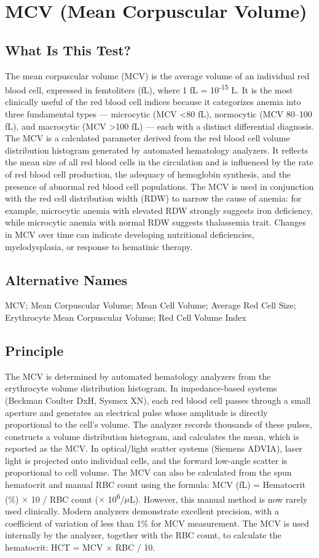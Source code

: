 \chapter{MCV (Mean Corpuscular Volume)}

\section*{What Is This Test?}
The mean corpuscular volume (MCV) is the average volume of an individual red blood cell, expressed in femtoliters (fL), where 1 fL = 10\textsuperscript{-15} L. It is the most clinically useful of the red blood cell indices because it categorizes anemia into three fundamental types --- microcytic (MCV <80 fL), normocytic (MCV 80--100 fL), and macrocytic (MCV >100 fL) --- each with a distinct differential diagnosis. The MCV is a calculated parameter derived from the red blood cell volume distribution histogram generated by automated hematology analyzers. It reflects the mean size of all red blood cells in the circulation and is influenced by the rate of red blood cell production, the adequacy of hemoglobin synthesis, and the presence of abnormal red blood cell populations. The MCV is used in conjunction with the red cell distribution width (RDW) to narrow the cause of anemia: for example, microcytic anemia with elevated RDW strongly suggests iron deficiency, while microcytic anemia with normal RDW suggests thalassemia trait. Changes in MCV over time can indicate developing nutritional deficiencies, myelodysplasia, or response to hematinic therapy.

\section*{Alternative Names}
MCV; Mean Corpuscular Volume; Mean Cell Volume; Average Red Cell Size; Erythrocyte Mean Corpuscular Volume; Red Cell Volume Index

\section*{Principle}
The MCV is determined by automated hematology analyzers from the erythrocyte volume distribution histogram. In impedance-based systems (Beckman Coulter DxH, Sysmex XN), each red blood cell passes through a small aperture and generates an electrical pulse whose amplitude is directly proportional to the cell's volume. The analyzer records thousands of these pulses, constructs a volume distribution histogram, and calculates the mean, which is reported as the MCV. In optical/light scatter systems (Siemens ADVIA), laser light is projected onto individual cells, and the forward low-angle scatter is proportional to cell volume. The MCV can also be calculated from the spun hematocrit and manual RBC count using the formula: MCV (fL) = Hematocrit (\%)  $\times$ 10 /  RBC count  ($\times$ 10\textsuperscript{6}/$\mu$L). However, this manual method is now rarely used clinically. Modern analyzers demonstrate excellent precision, with a coefficient of variation of less than 1\% for MCV measurement. The MCV is used internally by the analyzer, together with the RBC count, to calculate the hematocrit: HCT = MCV $\times$ RBC / 10.

